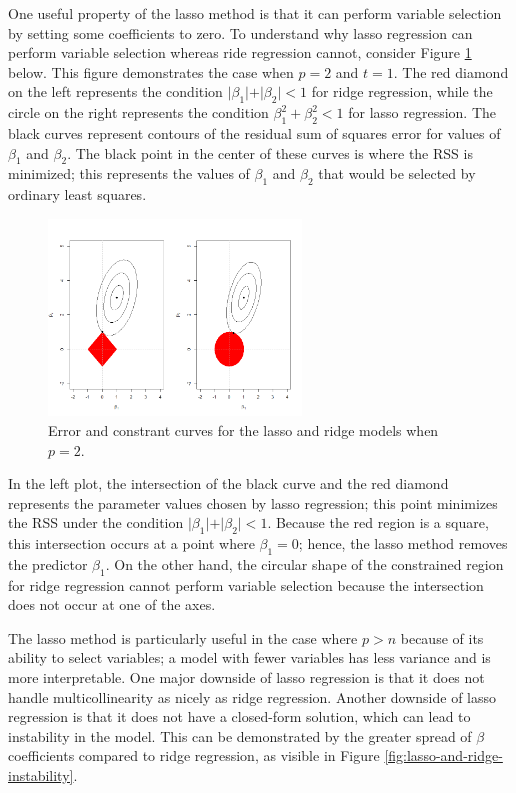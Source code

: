 \documentclass{article}
\begin{document}
One useful property of the lasso method is that it can perform variable selection by setting some coefficients to zero. To understand why lasso regression can perform variable selection whereas ride regression cannot, consider Figure \ref{fig:ridge-lasso} below. This figure demonstrates the case when $p=2$ and $t = 1$. The red diamond on the left represents the condition $\vert \beta_1 \vert + \vert \beta_2 \vert < 1$ for ridge regression, while the circle on the right represents the condition $\beta_1^2 + \beta_2^2 < 1$ for lasso regression. The black curves represent contours of the residual sum of squares error for values of $\beta_1$ and $\beta_2$. The black point in the center of these curves is where the RSS is minimized; this represents the values of $\beta_1$ and $\beta_2$ that would be selected by ordinary least squares.

\begin{figure}[!h]
	\centering
	\caption{Error and constrant curves for the lasso and ridge models when $p=2$.}
	\label{fig:ridge-lasso}
	\includegraphics[width = 0.6\textwidth]{ridge-lasso.png}
\end{figure}

In the left plot, the intersection of the black curve and the red diamond represents the parameter values chosen by lasso regression; this point minimizes the RSS under the condition $\vert \beta_1 \vert + \vert \beta_2 \vert < 1$. Because the red region is a square, this intersection occurs at a point where $\beta_1 = 0$; hence, the lasso method removes the predictor $\beta_1$. On the other hand, the circular shape of the constrained region for ridge regression cannot perform variable selection because the intersection does not occur at one of the axes.

The lasso method is particularly useful in the case where $p>n$ because of its ability to select variables; a model with fewer variables has less variance and is more interpretable. One major downside of lasso regression is that it does not handle multicollinearity as nicely as ridge regression. Another downside of lasso regression is that it does not have a closed-form solution, which can lead to instability in the model. This can be demonstrated by the greater spread of $\beta$ coefficients compared to ridge regression, as visible in Figure \ref{fig:lasso-and-ridge-instability}.
\end{document}
